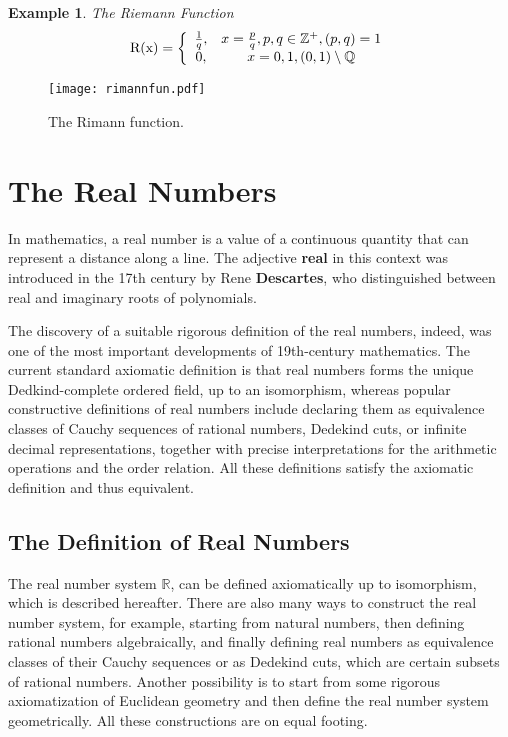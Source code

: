 \documentclass[a4paper,12pt]{article} %
\newtheorem{example}{Example}[section]
\begin{document}
\begin{example}{The Riemann Function}
    \[
        \rm R(x) = \left\{ \begin{array}{cc} 
            \frac{1}{q}, & x = \frac{p}{q}, p, q \in \mathbb{Z}^+, (p, q) = 1\\
                   0,    & x = 0, 1, (0,1) \setminus \mathbb{Q}
        \end{array}\right.
        \]
\end{example}
\begin{figure}[h!]
    \centering
    \texttt{[image: rimannfun.pdf]}
    \caption{The Rimann function.}
    \label{fig:rimann}
\end{figure}




\section{The Real Numbers}
In mathematics, a real number is a value of a continuous quantity 
that can represent a distance along a line. The adjective \textbf{real}
in this context was introduced in the 17th century by Rene \textbf{Descartes},
who distinguished between real and imaginary roots of polynomials.

The discovery of a suitable rigorous definition of the real numbers,
indeed, was one of the most important developments of 19th-century 
mathematics. The current standard axiomatic definition is that 
real numbers forms the unique Dedkind-complete ordered field, up to 
an isomorphism, whereas popular constructive definitions of 
real numbers include declaring them as equivalence classes of 
Cauchy sequences of rational numbers, Dedekind cuts, 
or infinite decimal representations, together with precise 
interpretations for the arithmetic operations and the order 
relation. All these definitions satisfy the axiomatic 
definition and thus equivalent.

\subsection{The Definition of Real Numbers}
The real number system $\mathbb{R}$, can be defined axiomatically 
up to isomorphism, which is described hereafter. There are also 
many ways to construct the real number system, for example, starting
from natural numbers, then defining rational numbers algebraically,
and finally defining real numbers as equivalence classes of their 
Cauchy sequences or as Dedekind cuts, which are certain subsets 
of rational numbers. Another possibility is to start from some 
rigorous axiomatization of Euclidean geometry and then define 
the real number system geometrically. All these constructions 
are on equal footing.
\end{document}
